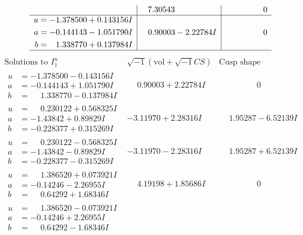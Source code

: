 \documentclass[1p]{elsarticle_modified}
\theoremstyle{definition}
\newcommand{\I}{\sqrt{-1}}
\begin{document}
$$\begin{array}{c|c|c}
 & \phantom{-}7.30543\phantom{ +0.000000I} & \phantom{-0.000000 } 0 \\ \hline\begin{aligned}
u &= -1.378500 + 0.143156 I \\
a &= -0.144143 - 1.051790 I \\
b &= \phantom{-}1.338770 + 0.137984 I\end{aligned}
 & \phantom{-}0.90003 - 2.22784 I & \phantom{-0.000000 } 0\\
 \hline 
 \end{array}$$\newpage$$\begin{array}{c|c|c}  
\text{Solutions to }I^u_{1}& \I (\text{vol} + \sqrt{-1}CS) & \text{Cusp shape}\\
 \hline 
\begin{aligned}
u &= -1.378500 - 0.143156 I \\
a &= -0.144143 + 1.051790 I \\
b &= \phantom{-}1.338770 - 0.137984 I\end{aligned}
 & \phantom{-}0.90003 + 2.22784 I & \phantom{-0.000000 } 0 \\ \hline\begin{aligned}
u &= \phantom{-}0.230122 + 0.568325 I \\
a &= -1.43842 + 0.89829 I \\
b &= -0.228377 + 0.315269 I\end{aligned}
 & -3.11970 + 2.28316 I & \phantom{-}1.95287 - 6.52139 I \\ \hline\begin{aligned}
u &= \phantom{-}0.230122 - 0.568325 I \\
a &= -1.43842 - 0.89829 I \\
b &= -0.228377 - 0.315269 I\end{aligned}
 & -3.11970 - 2.28316 I & \phantom{-}1.95287 + 6.52139 I \\ \hline\begin{aligned}
u &= \phantom{-}1.386520 + 0.073921 I \\
a &= -0.14246 - 2.26955 I \\
b &= \phantom{-}0.64292 + 1.68346 I\end{aligned}
 & \phantom{-}4.19198 + 1.85686 I & \phantom{-0.000000 } 0 \\ \hline\begin{aligned}
u &= \phantom{-}1.386520 - 0.073921 I \\
a &= -0.14246 + 2.26955 I \\
b &= \phantom{-}0.64292 - 1.68346 I\end{aligned}

\end{array}$$
\end{document}
